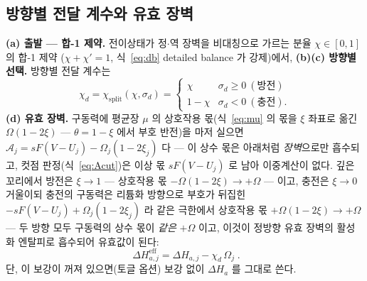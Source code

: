\documentclass[11pt,a4paper]{article}
\newcommand{\eff}{\mathrm{eff}}
\begin{document}
\subsection{방향별 전달 계수와 유효 장벽}
\textbf{(a) 출발 — 합-1 제약.} 전이상태가 정$\cdot$역 장벽을 비대칭으로 가르는 분율 $\chi\in[0,1]$ 의 합-1 제약
($\chi+\chi'=1$, 식~\eqref{eq:db} detailed balance 가 강제)에서, \textbf{(b)(c) 방향별 선택.} 방향별 전달 계수는
\begin{equation}
\chi_d=\chi_\mathrm{split}(\chi,\sigma_d)=
\begin{cases}\chi & \sigma_d\ge0\ (\text{방전})\\ 1-\chi & \sigma_d<0\ (\text{충전}).\end{cases}
\label{eq:chid}
\end{equation}
\textbf{(d) 유효 장벽.}
구동력에 평균장 $\mu$ 의 상호작용 몫(식~\eqref{eq:mu} 의 몫을 $\xi$ 좌표로 옮긴 $\Omega(1-2\xi)$ — $\theta=1-\xi$ 에서 부호 반전)을 마저 실으면
$\mathcal A_j=sF(V-U_j)-\Omega_j(1-2\xi_j)$ 다 — 이 상수 몫은 아래처럼 \emph{장벽}으로만 흡수되고, 컷점
판정(식~\eqref{eq:Acut})은 이상 몫 $sF(V-U_j)$ 로 남아 이중계산이 없다.
깊은 꼬리에서 방전은 $\xi\to1$ — 상호작용 몫
$-\Omega(1-2\xi)\to+\Omega$ — 이고, 충전은 $\xi\to0$ 거울이되 충전의 구동력은 리튬화 방향으로 부호가 뒤집힌
$-sF(V-U_j)+\Omega_j(1-2\xi_j)$ 라 같은 극한에서 상호작용 몫 $+\Omega(1-2\xi)\to+\Omega$ — 두 방향 모두
구동력의 상수 몫이 \emph{같은} $+\Omega$ 이고, 이것이 정방향 유효 장벽의 활성화 엔탈피로 흡수되어 유효값이 된다:
\begin{equation}
\boxed{\;\Delta H_{a,j}^\eff=\Delta H_{a,j}-\chi_d\,\Omega_j\;.}
\label{eq:dHeff}
\end{equation}
단, 이 보강이 꺼져 있으면(토글 옵션) 보강 없이 $\Delta H_a$ 를 그대로 쓴다.
\end{document}
